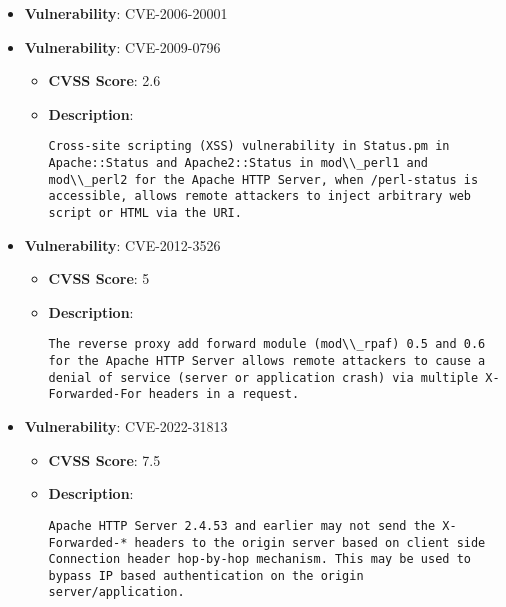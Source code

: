 \documentclass{article}
\begin{document}
\begin{itemize}
        \item \textbf{Vulnerability}: CVE-2006-20001
    
        \item \textbf{Vulnerability}: CVE-2009-0796
        \begin{itemize}
            \item \textbf{CVSS Score}:  2.6 
            \item \textbf{Description}:
            \parbox[t]{0.9\linewidth}{
                \verb|Cross-site scripting (XSS) vulnerability in Status.pm in Apache::Status and Apache2::Status in mod\\_perl1 and mod\\_perl2 for the Apache HTTP Server, when /perl-status is accessible, allows remote attackers to inject arbitrary web script or HTML via the URI.|
            }
        \end{itemize}
    
        \item \textbf{Vulnerability}: CVE-2012-3526
        \begin{itemize}
            \item \textbf{CVSS Score}:  5 
            \item \textbf{Description}:
            \parbox[t]{0.9\linewidth}{
                \verb|The reverse proxy add forward module (mod\\_rpaf) 0.5 and 0.6 for the Apache HTTP Server allows remote attackers to cause a denial of service (server or application crash) via multiple X-Forwarded-For headers in a request.|
            }
        \end{itemize}
    
        \item \textbf{Vulnerability}: CVE-2022-31813
        \begin{itemize}
            \item \textbf{CVSS Score}:  7.5 
            \item \textbf{Description}:
            \parbox[t]{0.9\linewidth}{
                \verb|Apache HTTP Server 2.4.53 and earlier may not send the X-Forwarded-* headers to the origin server based on client side Connection header hop-by-hop mechanism. This may be used to bypass IP based authentication on the origin server/application.|
            }
        \end{itemize}
    

\end{itemize}
\end{document}
